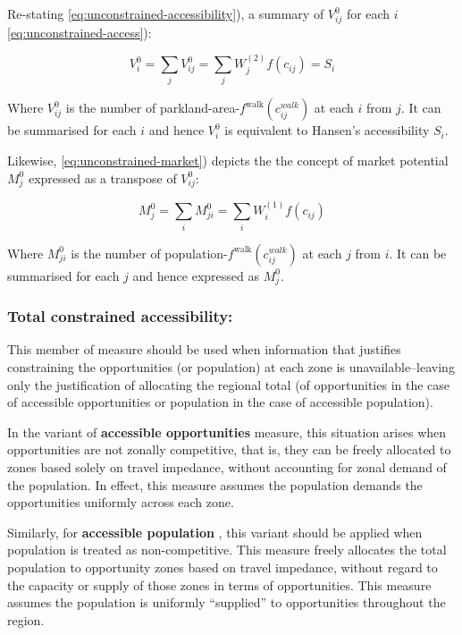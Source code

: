 \documentclass[
11pt, %
oneside, %
english, %
singlespacing, %
]{macthesis} %
\begin{document}
Re-stating \ref{eq:unconstrained-accessibility}), a summary of \(V_{ij}^0\) for each \(i\) \ref{eq:unconstrained-access}):

\begin{equation}
\label{eq:unconstrained-accessibility}
V^0_i = \sum_j V^0_{ij} = \sum_j W^{(2)}_j f(c_{ij}) = S_i
\end{equation} 

Where \(V^0_{ij}\) is the number of parkland-area-\(f^\text{walk}(c^{walk}_{ij})\) at each \(i\) from \(j\). It can be summarised for each \(i\) and hence \(V^0_i\) is equivalent to Hansen's accessibility \(S_i\).

Likewise, \ref{eq:unconstrained-market}) depicts the the concept of market potential \(M_j^0\) expressed as a transpose of \(V^0_{ij}\):

\begin{equation}
\label{eq:unconstrained-market}
M_j^0 = \sum_i M^0_{ji} = \sum_i W_i^{(1)} f(c_{ij})
\end{equation} 

Where \(M^0_{ji}\) is the number of population-\(f^\text{walk}(c^{walk}_{ij})\) at each \(j\) from \(i\). It can be summarised for each \(j\) and hence expressed as \(M^0_j\).

\subsubsection{Total constrained accessibility:}\label{total-constrained-accessibility-1}

This member of measure should be used when information that justifies constraining the opportunities (or population) at each zone is unavailable--leaving only the justification of allocating the regional total (of opportunities in the case of accessible opportunities or population in the case of accessible population).

In the variant of \textbf{accessible opportunities} measure, this situation arises when opportunities are not zonally competitive, that is, they can be freely allocated to zones based solely on travel impedance, without accounting for zonal demand of the population. In effect, this measure assumes the population demands the opportunities uniformly across each zone.

Similarly, for \textbf{accessible population} , this variant should be applied when population is treated as non-competitive. This measure freely allocates the total population to opportunity zones based on travel impedance, without regard to the capacity or supply of those zones in terms of opportunities. This measure assumes the population is uniformly ``supplied'' to opportunities throughout the region.
\end{document}
